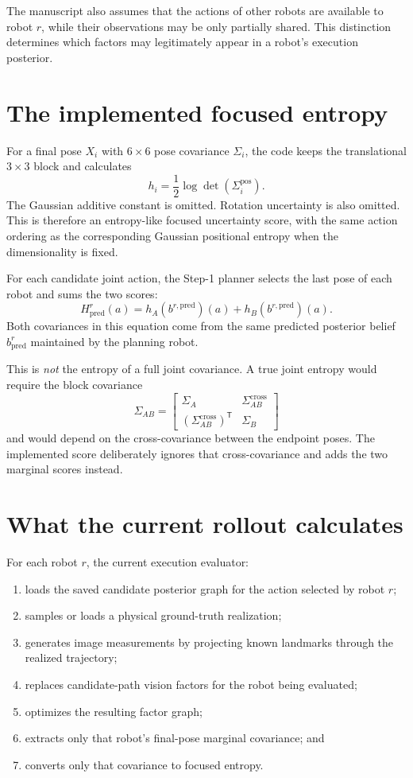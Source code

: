 \documentclass[11pt,a4paper]{article}
\newcommand{\hpose}[2]{h_{#1}\!\left(b^{#2}\right)}
\begin{document}
The manuscript also assumes that the actions of other robots are available to
robot $r$, while their observations may be only partially shared.  This
distinction determines which factors may legitimately appear in a robot's
execution posterior.

\section{The implemented focused entropy}

For a final pose $X_i$ with $6\times6$ pose covariance $\Sigma_i$, the code
keeps the translational $3\times3$ block and calculates
\[
  h_i
  =\frac{1}{2}\log\det\!\left(\Sigma_i^{\mathrm{pos}}\right).
\]
The Gaussian additive constant is omitted.  Rotation uncertainty is also
omitted.  This is therefore an entropy-like focused uncertainty score, with
the same action ordering as the corresponding Gaussian positional entropy
when the dimensionality is fixed.

For each candidate joint action, the Step-1 planner selects the last pose of
each robot and sums the two scores:
\[
  H_{\mathrm{pred}}^r(a)
  = \hpose{A}{r,\mathrm{pred}}(a)
   +\hpose{B}{r,\mathrm{pred}}(a).
\]
Both covariances in this equation come from the same predicted posterior belief
$b_{\mathrm{pred}}^r$ maintained by the planning robot.

This is \emph{not} the entropy of a full joint covariance.  A true joint
entropy would require the block covariance
\[
  \Sigma_{AB}
  =\begin{bmatrix}
      \Sigma_A & \Sigma_{AB}^{\mathrm{cross}}\\
      (\Sigma_{AB}^{\mathrm{cross}})^\mathsf T & \Sigma_B
    \end{bmatrix}
\]
and would depend on the cross-covariance between the endpoint poses.  The
implemented score deliberately ignores that cross-covariance and adds the two
marginal scores instead.

\section{What the current rollout calculates}

For each robot $r$, the current execution evaluator:
\begin{enumerate}
  \item loads the saved candidate posterior graph for the action selected by
        robot $r$;
  \item samples or loads a physical ground-truth realization;
  \item generates image measurements by projecting known landmarks through
        the realized trajectory;
  \item replaces candidate-path vision factors for the robot being evaluated;
  \item optimizes the resulting factor graph;
  \item extracts only that robot's final-pose marginal covariance; and
  \item converts only that covariance to focused entropy.
\end{enumerate}
\end{document}
